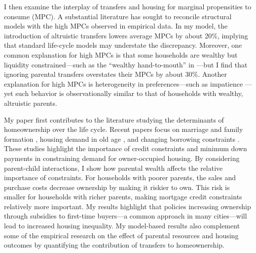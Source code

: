 \documentclass[12pt]{article}
\begin{document}
I then examine the interplay  of transfers and housing for marginal propensities to consume (MPC). A substantial literature has sought to reconcile structural models with the high MPCs observed in empirical data.  In my model, the introduction of altruistic transfers lowers average MPCs by about 20\%, implying that standard life-cycle models may understate the discrepancy.  Moreover, one common explanation for high MPCs is that some households are wealthy but liquidity constrained---such as the ``wealthy hand-to-mouth'' in \cite{kaplan2022marginal}---but I find that ignoring parental transfers overstates their MPCs by about 30\%. Another explanation for high MPCs is heterogeneity in preferences---such as impatience \citep[e.g.,][]{aguiar2024hand}---yet such behavior is observationally similar to that of households with wealthy, altruistic parents.



My paper first contributes to the literature studying the determinants of homeownership over the life cycle. Recent papers focus on marriage and family formation \citep{Fisher2011,Chang2024,Khorunzhina2019}, housing demand in old age \citep{McGee2019,Barczyk2020a}, and changing borrowing constraints \citep{Paz-Pardo2019,Mabille2020}. These studies highlight the importance of credit constraints and minimum down payments in constraining demand for owner-occupied housing. By considering parent-child interactions, I show how parental wealth affects the relative importance of constraints. For households with poorer parents, the sales and purchase costs decrease ownership by making it riskier to own. This risk is smaller for households with richer parents, making mortgage credit constraints relatively more important. My results highlight that policies increasing ownership through subsidies to first-time buyers---a common approach in many cities---will lead to increased housing inequality. My model-based results also complement some of the empirical research on the effect of parental resources and housing outcomes \citep[see e.g.,][for recent work]{wold2024housing,daysal2023intergenerational,benetton2022dynastic,boileau2023drives} by quantifying the contribution of transfers to homeownership.
\end{document}
